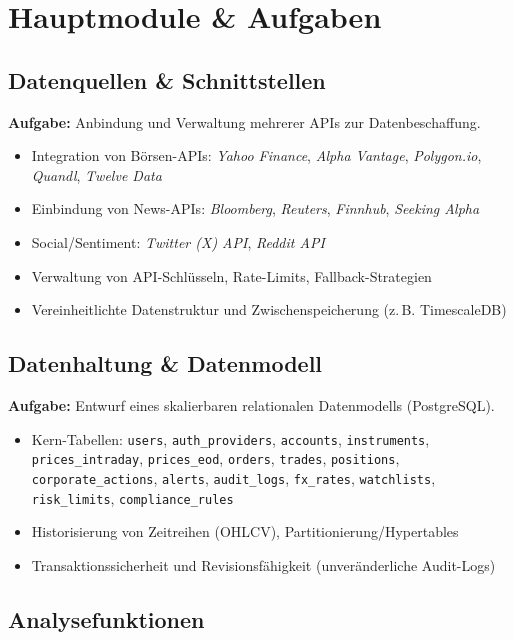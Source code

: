 \documentclass{article}
\begin{document}
\section{Hauptmodule \& Aufgaben}

\subsection{Datenquellen \& Schnittstellen}
\textbf{Aufgabe:} Anbindung und Verwaltung mehrerer APIs zur Datenbeschaffung.
\begin{itemize}
  \item Integration von Börsen-APIs: \emph{Yahoo Finance}, \emph{Alpha Vantage}, \emph{Polygon.io}, \emph{Quandl}, \emph{Twelve Data}
  \item Einbindung von News-APIs: \emph{Bloomberg}, \emph{Reuters}, \emph{Finnhub}, \emph{Seeking Alpha}
  \item Social/Sentiment: \emph{Twitter (X) API}, \emph{Reddit API}
  \item Verwaltung von API-Schlüsseln, Rate-Limits, Fallback-Strategien
  \item Vereinheitlichte Datenstruktur und Zwischenspeicherung (z.\,B. TimescaleDB)
\end{itemize}

\subsection{Datenhaltung \& Datenmodell}
\textbf{Aufgabe:} Entwurf eines skalierbaren relationalen Datenmodells (PostgreSQL).
\begin{itemize}
  \item Kern-Tabellen: \texttt{users}, \texttt{auth\_providers}, \texttt{accounts}, \texttt{instruments}, \texttt{prices\_intraday}, \texttt{prices\_eod}, \texttt{orders}, \texttt{trades}, \texttt{positions}, \texttt{corporate\_actions}, \texttt{alerts}, \texttt{audit\_logs}, \texttt{fx\_rates}, \texttt{watchlists}, \texttt{risk\_limits}, \texttt{compliance\_rules}
  \item Historisierung von Zeitreihen (OHLCV), Partitionierung/Hypertables
  \item Transaktionssicherheit und Revisionsfähigkeit (unveränderliche Audit-Logs)
\end{itemize}

\subsection{Analysefunktionen}
\end{document}
